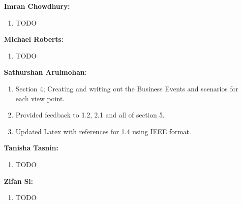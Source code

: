 \documentclass[]{article}
\begin{document}
\textbf{Imran Chowdhury:}
\begin{enumerate}
	\item TODO
\end{enumerate}

\textbf{Michael Roberts:}
\begin{enumerate}
	\item TODO
\end{enumerate}

\textbf{Sathurshan Arulmohan:}
\begin{enumerate}
	\item Section 4; Creating and writing out the Business Events and scenarios for each view point.
	\item Provided feedback to 1.2, 2.1 and all of section 5.
	\item Updated Latex with references for 1.4 using IEEE format.
\end{enumerate}

\textbf{Tanisha Tasnin:}
\begin{enumerate}
	\item TODO
\end{enumerate}

\textbf{Zifan Si:}
\begin{enumerate}
	\item TODO
\end{enumerate}

\end{document}

